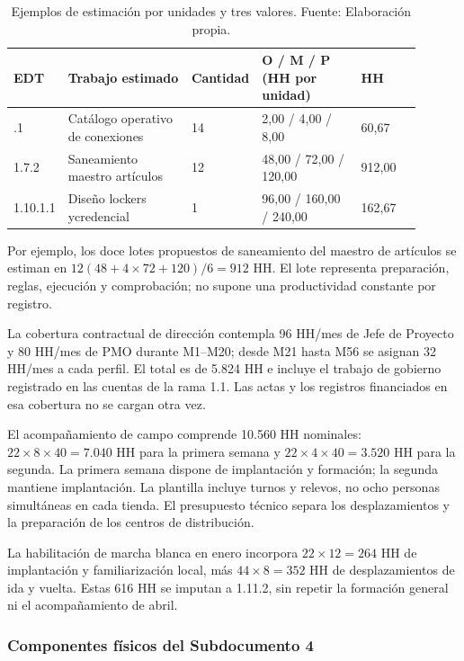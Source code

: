 \documentclass[11pt]{article}
\begin{document}
\begingroup
\small
\begin{longtable}{@{}p{0.09\linewidth}p{0.31\linewidth}p{0.1\linewidth}p{0.25\linewidth}p{0.15\linewidth}@{}}
\caption[Ejemplos de estimación por unidades y tres valores]{Ejemplos de estimación por unidades y tres valores. Fuente: Elaboración propia.}\label{tab:t15-2}\\
\toprule
\textbf{EDT} & \textbf{Trabajo estimado} & \textbf{Cantidad} & \textbf{O / M / P (HH por unidad)} & \textbf{HH} \\
\midrule
\endhead
\bottomrule
\endlastfoot
1.6.1 & Catálogo operativo de conexiones & 14 & 2,00 / 4,00 / 8,00 & 60,67 \\
1.7.2 & Saneamiento maestro artículos & 12 & 48,00 / 72,00 / 120,00 & 912,00 \\
1.10.1.1 & Diseño lockers ycredencial & 1 & 96,00 / 160,00 / 240,00 & 162,67 \\
\end{longtable}
\endgroup

Por ejemplo, los doce lotes propuestos de saneamiento del maestro de artículos se estiman en $12(48+4\times72+120)/6=912$ HH. El lote representa preparación, reglas, ejecución y comprobación; no supone una productividad constante por registro.

La cobertura contractual de dirección contempla 96 HH/mes de Jefe de Proyecto y 80 HH/mes de PMO durante M1--M20; desde M21 hasta M56 se asignan 32 HH/mes a cada perfil. El total es de 5.824 HH e incluye el trabajo de gobierno registrado en las cuentas de la rama 1.1. Las actas y los registros financiados en esa cobertura no se cargan otra vez.

El acompañamiento de campo comprende 10.560 HH nominales: $22\times8\times40=7.040$ HH para la primera semana y $22\times4\times40=3.520$ HH para la segunda. La primera semana dispone de implantación y formación; la segunda mantiene implantación. La plantilla incluye turnos y relevos, no ocho personas simultáneas en cada tienda. El presupuesto técnico separa los desplazamientos y la preparación de los centros de distribución.

La habilitación de marcha blanca en enero incorpora $22\times12=264$ HH de implantación y familiarización local, más $44\times8=352$ HH de desplazamientos de ida y vuelta. Estas 616 HH se imputan a 1.11.2, sin repetir la formación general ni el acompañamiento de abril.

\subsubsection{Componentes físicos del Subdocumento 4}
\end{document}
